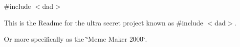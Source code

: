 \#include $<$dad$>$

This is the Readme for the ultra secret project known as \#include $<$dad$>$.

Or more specifically as the \char`\"{}\+Meme Maker 2000\char`\"{}. 